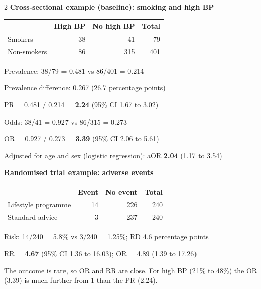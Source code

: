 \documentclass[style1, note, nocover]{neudata}
\begin{document}
\begin{multicols}{2}
\vspace{3pt}
{\small\textbf{Cross-sectional example (baseline): smoking and high BP}}\par
{\small
\begin{tabular}{@{}lrrr@{}}
\toprule
 & High BP & No high BP & Total\\\midrule
Smokers & 38 & 41 & 79\\
Non-smokers & 86 & 315 & 401\\\bottomrule
\end{tabular}\par
Prevalence: 38/79 = 0.481 vs 86/401 = 0.214\par
Prevalence difference: 0.267 (26.7 percentage points)\par
PR = 0.481 / 0.214 = \textbf{2.24} (95\% CI 1.67 to 3.02)\par
Odds: 38/41 = 0.927 vs 86/315 = 0.273\par
OR = 0.927 / 0.273 = \textbf{3.39} (95\% CI 2.06 to 5.61)\par
Adjusted for age and sex (logistic regression): aOR \textbf{2.04} (1.17 to 3.54)\par}

\vspace{3pt}
{\small\textbf{Randomised trial example: adverse events}}\par
{\small
\begin{tabular}{@{}lrrr@{}}
\toprule
 & Event & No event & Total\\\midrule
Lifestyle programme & 14 & 226 & 240\\
Standard advice & 3 & 237 & 240\\\bottomrule
\end{tabular}\par
Risk: 14/240 = 5.8\% vs 3/240 = 1.25\%; RD 4.6 percentage points\par
RR = \textbf{4.67} (95\% CI 1.36 to 16.03); OR = 4.89 (1.39 to 17.26)\par
The outcome is rare, so OR and RR are close. For high BP (21\% to 48\%) the OR (3.39) is much further from 1 than the PR (2.24).\par}


\end{multicols}
\end{document}

